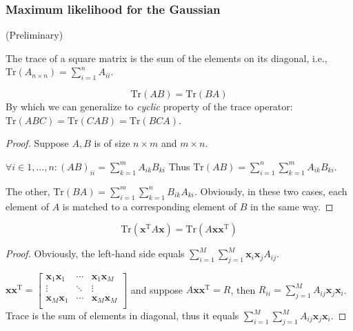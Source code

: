 \subsubsection{Maximum likelihood for the Gaussian}
(Preliminary)
\begin{definition}
The trace of a square matrix is the sum of the elements on its
diagonal, i.e., $\text{Tr}(A_{n\times{}n})=\sum_{i=1}^{n}A_{ii}$.
\end{definition}
\begin{conclusion}
\begin{equation}
\text{Tr}(AB)=\text{Tr}(BA)
\label{eqn:exchangetr}    
\end{equation}
By which we can generalize to \emph{cyclic} property of the trace
operator: $\text{Tr}(ABC)=\text{Tr}(CAB)=\text{Tr}(BCA)$.
\end{conclusion}
\begin{proof}
Suppose $A,B$ is of size $n\times{}m$ and $m\times{}n$.


$\forall{}i\in{}1,\ldots,n:(AB)_{ii}=\sum_{k=1}^{m}A_{ik}B_{ki}$ Thus
$\text{Tr}(AB)=\sum_{i=1}^{n}\sum_{k=1}^{m}A_{ik}B_{ki}$.


The other, $\text{Tr}(BA)=\sum_{i=1}^{m}\sum_{k=1}^{n}B_{ik}A_{ki}$.
Obviously, in these two cases, each element of $A$ is matched to a corresponding element
of $B$ in the same way.
\end{proof}
\begin{conclusion}
\begin{equation}
\text{Tr}(\mathbf{x}^{\mathrm{T}}A\mathbf{x})=\text{Tr}(A\mathbf{x}\mathbf{x}^{\mathrm{T}})
\label{eqn:trquadraticchange}
\end{equation}
\end{conclusion}
\begin{proof}
Obviously, the left-hand side equals
$\sum_{i=1}^{M}\sum_{j=1}^{M}\mathbf{x}_{i}\mathbf{x}_{j}A_{ij}$.


$\mathbf{x}\mathbf{x}^{\mathrm{T}}=\begin{bmatrix}\mathbf{x}_{1}\mathbf{x}_{1}&\cdots{}&\mathbf{x}_{1}\mathbf{x}_{M}\\\vdots{}&\ddots{}&\vdots{}\\\mathbf{x}_{M}\mathbf{x}_{1}&\cdots{}&\mathbf{x}_{M}\mathbf{x}_{M}\\\end{bmatrix}$
and suppose $A\mathbf{x}\mathbf{x}^{\mathrm{T}}=R$, then
$R_{ii}=\sum_{j=1}^{M}A_{ij}\mathbf{x}_{j}\mathbf{x}_{i}$. Trace is
the sum of elements in diagonal, thus it equals
$\sum_{i=1}^{M}\sum_{j=1}^{M}A_{ij}\mathbf{x}_{j}\mathbf{x}_{i}$.
\end{proof}
